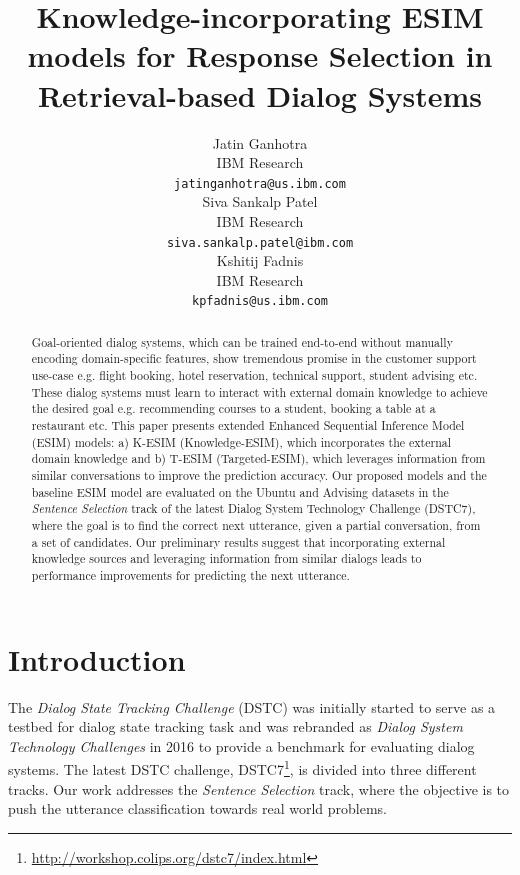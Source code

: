 \documentclass[letterpaper]{article} %
\begin{document}
%
\title{Knowledge-incorporating ESIM models for Response Selection in Retrieval-based Dialog Systems}
\author{
  Jatin Ganhotra \\
  IBM Research \\
  {\tt jatinganhotra@us.ibm.com}
  \\\And
  Siva Sankalp Patel \\
  IBM Research \\
  {\tt siva.sankalp.patel@ibm.com}
  \\\And
  Kshitij Fadnis \\
  IBM Research \\
  {\tt kpfadnis@us.ibm.com}
}

\maketitle

\begin{abstract}
Goal-oriented dialog systems, which can be trained end-to-end without manually encoding domain-specific features, show tremendous promise in the customer support use-case e.g. flight booking, hotel reservation, technical support, student advising etc. These dialog systems must learn to interact with external domain knowledge to achieve the desired goal e.g. recommending courses to a student, booking a table at a restaurant etc. This paper presents extended Enhanced Sequential Inference Model (ESIM) models: a) K-ESIM (Knowledge-ESIM), which incorporates the external domain knowledge and b) T-ESIM (Targeted-ESIM), which leverages information from similar conversations to improve the prediction accuracy. Our proposed models and the baseline ESIM model are evaluated on the Ubuntu and Advising datasets in the \textit{Sentence Selection} track of the latest Dialog System Technology Challenge (DSTC7), where the goal is to find the correct next utterance, given a partial conversation, from a set of candidates. Our preliminary results suggest that incorporating external knowledge sources and leveraging information from similar dialogs leads to performance improvements for predicting the next utterance.
\end{abstract}

\section{Introduction}
\label{Introduction}
The \textit{Dialog State Tracking Challenge} (DSTC) was initially started to serve as a testbed for dialog state tracking task and was rebranded as \textit{Dialog System Technology Challenges} in 2016 to provide a benchmark for evaluating dialog systems. The latest DSTC challenge, DSTC7\footnote{\url{http://workshop.colips.org/dstc7/index.html}}, is divided into three different tracks. Our work addresses the \textit{Sentence Selection} track, where the objective is to push the utterance classification towards real world problems.
\end{document}
